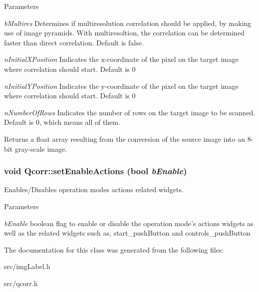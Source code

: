 \begin{DoxyParams}{Parameters}
\begin{DoxyItemize}
\end{DoxyItemize}\item[{\em bMultires}]Determines if multiresolution correlation should be applied, by making use of image pyramids. With multiresoltion, the correlation can be determined faster than direct correlation. Default is false. \item[{\em nInitialXPosition}]Indicates the x-\/coordinate of the pixel on the target image where correlation should start. Default is 0 \item[{\em nInitialYPosition}]Indicates the y-\/coordinate of the pixel on the target image where correlation should start. Default is 0 \item[{\em nNumberOfRows}]Indicates the number of rows on the target image to be scanned. Default is 0, which means all of them. \end{DoxyParams}
\begin{DoxyReturn}{Returns}
a float array resulting from the conversion of the source image into an 8-\/bit gray-\/scale image. 
\end{DoxyReturn}
\hypertarget{classQcorr_a2de6d6969bdf48b225acc5ebbae063f7}{
\subsubsection[{setEnableActions}]{\setlength{\rightskip}{0pt plus 5cm}void Qcorr::setEnableActions (bool {\em bEnable})}}
\label{classQcorr_a2de6d6969bdf48b225acc5ebbae063f7}


Enables/Disables operation modes actions related widgets. 
\begin{DoxyParams}{Parameters}
\item[{\em bEnable}]boolean flag to enable or disable the operation mode's actions widgets as well as the related widgets such as, start\_\-pushButton and controls\_\-pushButton \end{DoxyParams}


The documentation for this class was generated from the following files:\begin{DoxyCompactItemize}
\item 
src/imgLabel.h\item 
src/qcorr.h\end{DoxyCompactItemize}
